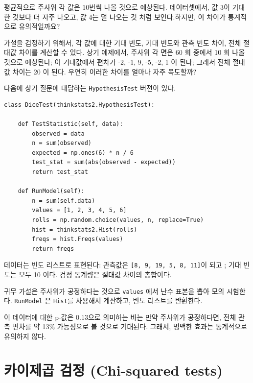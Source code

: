 평균적으로 주사위 각 값은 10번씩 나올 것으로 예상된다.
데이터셋에서, 값 3이 기대한 것보다 더 자주 나오고, 값 4는 덜 나오는 것 처럼 보인다.하지만, 이 차이가 통계적으로 유의적일까요?

가설을 검정하기 위해서, 각 값에 대한 기대 빈도, 기대 빈도와 관측 빈도 차이, 전체 절대값 차이를 계산할 수 있다. 상기 예제에서, 주사위 각 면은 60 회 중에서 10 회 나올 것으로 예상된다; 이 기대값에서 편차가 -2, -1, 9, -5, -2, 1 이 된다; 그래서 전체 절대값 차이는 20 이 된다. 우연히 이러한 차이를 얼마나 자주 목도할까?

다음에 상기 질문에 대답하는 {\tt HypothesisTest} 버젼이 있다.

\begin{verbatim}
class DiceTest(thinkstats2.HypothesisTest):

    def TestStatistic(self, data):
        observed = data
        n = sum(observed)
        expected = np.ones(6) * n / 6
        test_stat = sum(abs(observed - expected))
        return test_stat

    def RunModel(self):
        n = sum(self.data)
        values = [1, 2, 3, 4, 5, 6]
        rolls = np.random.choice(values, n, replace=True)
        hist = thinkstats2.Hist(rolls)
        freqs = hist.Freqs(values)
        return freqs
\end{verbatim}

데이터는 빈도 리스트로 표현된다: 관측값은 {\tt [8, 9, 19, 5, 8, 11]}이 되고 ; 기대 빈도는 모두 10 이다.
검정 통계량은 절대값 차이의 총합이다.

귀무 가설은 주사위가 공정하다는 것으로 {\tt values} 에서 난수 표본을 뽑아 모의 시험한다. {\tt RunModel} 은 {\tt Hist}를 사용해서 계산하고, 빈도 리스트를 반환한다.


이 데이터에 대한 p-값은 0.13으로 의미하는 바는 만약 주사위가 공정하다면, 전체 관측 편차를 약 13\% 가능성으로 볼 것으로 기대된다. 그래서, 명백한 효과는 통계적으로 유의하지 않다.


\section{카이제곱 검정 (Chi-squared tests)}
\label{casino2}

